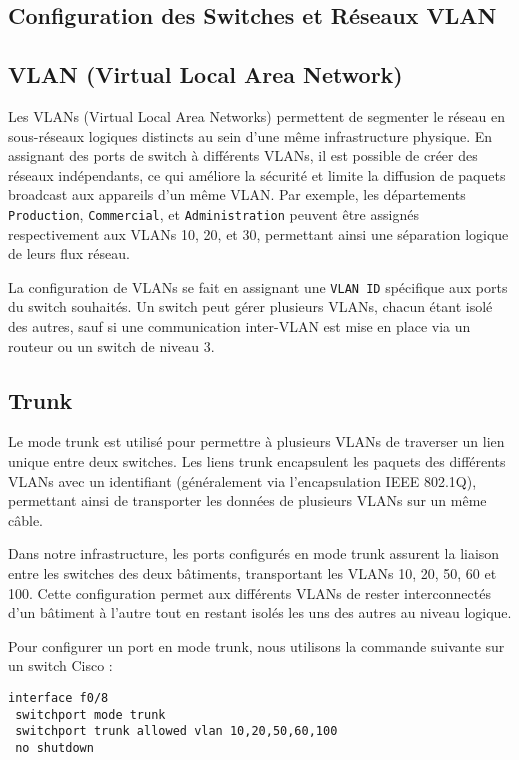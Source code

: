 \documentclass[a4paper,12pt]{report}
\begin{document}
\begin{itemize}
        \section{Configuration des Switches et Réseaux VLAN}

            \subsection{VLAN (Virtual Local Area Network)}
                Les VLANs (Virtual Local Area Networks) permettent de segmenter le réseau en sous-réseaux logiques distincts au sein d'une même infrastructure physique. En assignant des ports de switch à différents VLANs, il est possible de créer des réseaux indépendants, ce qui améliore la sécurité et limite la diffusion de paquets broadcast aux appareils d'un même VLAN. Par exemple, les départements \texttt{Production}, \texttt{Commercial}, et \texttt{Administration} peuvent être assignés respectivement aux VLANs 10, 20, et 30, permettant ainsi une séparation logique de leurs flux réseau.

                La configuration de VLANs se fait en assignant une \texttt{VLAN ID} spécifique aux ports du switch souhaités. Un switch peut gérer plusieurs VLANs, chacun étant isolé des autres, sauf si une communication inter-VLAN est mise en place via un routeur ou un switch de niveau 3.

            \subsection{Trunk}
                Le mode trunk est utilisé pour permettre à plusieurs VLANs de traverser un lien unique entre deux switches. Les liens trunk encapsulent les paquets des différents VLANs avec un identifiant (généralement via l'encapsulation IEEE 802.1Q), permettant ainsi de transporter les données de plusieurs VLANs sur un même câble.

                Dans notre infrastructure, les ports configurés en mode trunk assurent la liaison entre les switches des deux bâtiments, transportant les VLANs 10, 20, 50, 60 et 100. Cette configuration permet aux différents VLANs de rester interconnectés d'un bâtiment à l'autre tout en restant isolés les uns des autres au niveau logique. 

                Pour configurer un port en mode trunk, nous utilisons la commande suivante sur un switch Cisco :

                \begin{verbatim}
interface f0/8
 switchport mode trunk
 switchport trunk allowed vlan 10,20,50,60,100
 no shutdown
                \end{verbatim}


\end{itemize}
\end{document}
